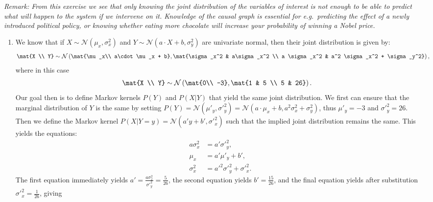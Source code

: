 \begin{enumerate}
  \emph{Remark: From this exercise we see that only knowing the joint distribution of the variables of interest is not enough to be able to predict what will happen to the system if we intervene on it. Knowledge of the causal graph is essential for e.g.\ predicting the effect of a newly introduced political policy, or knowing whether eating more chocolate will increase your probability of winning a Nobel price.}

  \begin{gradedsolution}
    \begin{enumerate}
      \item {} We know that if $X\sim\mathcal{N}(\mu_x,\sigma^2_x)$ and $Y\sim\mathcal{N}(a\cdot X+b, \sigma^2_y)$ are univariate normal, then their joint distribution is given by:
      \begin{align*}
        \mat{X \\ Y} &\sim \mathcal{N}\left( \mat{\mu_x\\ a\cdot\mu_x + b}, \mat{\sigma_x^2 & a\sigma_x^2 \\ a \sigma_x^2 & a^2 \sigma_x^2 + \sigma_y^2}\right),
      \end{align*}
      where in this case
      \begin{align*}
        \mat{X \\ Y} &\sim \mathcal{N}\left( \mat{0\\ -3}, \mat{1 & 5 \\ 5 & 26}\right).
      \end{align*}
      Our goal then is to define Markov kernels $P(Y)$ and $P(X|Y)$ that yield the same joint distribution. We first can ensure that the marginal distribution of $Y$ is the same by setting $P(Y) = \mathcal{N}(\mu'_y, \sigma'^2_y) = \mathcal{N}(a\cdot\mu_x + b, a^2 \sigma_x^2 + \sigma_y^2)$, thus $\mu'_y=-3$ and $\sigma'^2_y=26$. Then we define the Markov kernel $P(X|Y=y) = \mathcal{N}(a'y + b', \sigma'^2_x)$ such that the implied joint distribution remains the same. This yields the equations:
      \begin{align*}
        a\sigma_x^2 & = a' \sigma'^2_y,                 \\
        \mu_x       & = a' \mu'_y + b',                 \\
        \sigma^2_x  & = a'^2 \sigma'^2_y + \sigma'^2_x.
      \end{align*}
      The first equation immediately yields $a' = \frac{a\sigma_x^2}{\sigma'^2_y} = \frac{5}{26}$, the second equation yields $b' = \frac{15}{26}$, and the final equation yields after substitution $\sigma'^2_x = \frac{1}{26}$, giving

\end{enumerate}
\end{gradedsolution}
\end{enumerate}
